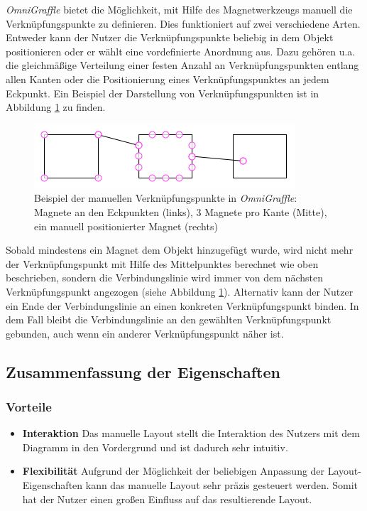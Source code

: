 \textit{OmniGraffle} bietet die Möglichkeit, mit Hilfe des Magnetwerkzeugs manuell die Verknüpfungspunkte zu definieren. Dies funktioniert auf zwei verschiedene Arten. Entweder kann der Nutzer die Verknüpfungspunkte beliebig in dem Objekt positionieren oder er wählt eine vordefinierte Anordnung aus. Dazu gehören u.a. die gleichmäßige Verteilung einer festen Anzahl an Verknüpfungspunkten entlang allen Kanten oder die Positionierung eines Verknüpfungspunktes an jedem Eckpunkt. Ein Beispiel der Darstellung von Verknüpfungspunkten ist in Abbildung \ref{fig:omnigraffle-magnets-example} zu finden.

\begin{figure}[hbt]
    \centering
    \includegraphics{resources/omnigraffle-magnets-example.png}
    \caption{Beispiel der manuellen Verknüpfungspunkte in \textit{OmniGraffle}: Magnete an den Eckpunkten (links), 3 Magnete pro Kante (Mitte), ein manuell positionierter Magnet (rechts)}
    \label{fig:omnigraffle-magnets-example}
\end{figure}

Sobald mindestens ein Magnet dem Objekt hinzugefügt wurde, wird nicht mehr der Verknüpfungspunkt mit Hilfe des Mittelpunktes berechnet wie oben beschrieben, sondern die Verbindungslinie wird immer von dem nächsten Verknüpfungspunkt angezogen (siehe Abbildung \ref{fig:omnigraffle-magnets-example}). Alternativ kann der Nutzer ein Ende der Verbindungslinie an einen konkreten Verknüpfungspunkt binden. In dem Fall bleibt die Verbindungslinie an den gewählten Verknüpfungspunkt gebunden, auch wenn ein anderer Verknüpfungspunkt näher ist.

\subsection{Zusammenfassung der Eigenschaften}

\subsubsection{Vorteile}

\begin{itemize}
    \item \textbf{Interaktion} Das manuelle Layout stellt die Interaktion des Nutzers mit dem Diagramm in den Vordergrund und ist dadurch sehr intuitiv.
    \item \textbf{Flexibilität} Aufgrund der Möglichkeit der beliebigen Anpassung der Layout-Eigenschaften kann das manuelle Layout sehr präzis gesteuert werden. Somit hat der Nutzer einen großen Einfluss auf das resultierende Layout.
\end{itemize}

